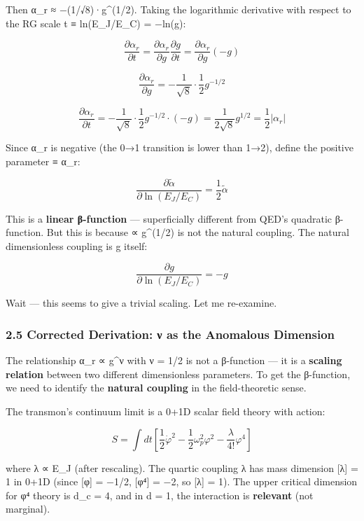 \documentclass[
]{article}
\begin{document}
Then α\_r ≈ −(1/√8)·g\^{}(1/2). Taking the logarithmic derivative with
respect to the RG scale t ≡ ln(E\_J/E\_C) = −ln(g):

\[\frac{\partial\alpha_r}{\partial t} = \frac{\partial\alpha_r}{\partial g}\frac{\partial g}{\partial t} = \frac{\partial\alpha_r}{\partial g}(-g)\]

\[\frac{\partial\alpha_r}{\partial g} = -\frac{1}{\sqrt{8}}\cdot\frac{1}{2}g^{-1/2}\]

\[\frac{\partial\alpha_r}{\partial t} = -\frac{1}{\sqrt{8}}\cdot\frac{1}{2}g^{-1/2}\cdot(-g) = \frac{1}{2\sqrt{8}}g^{1/2} = \frac{1}{2}|\alpha_r|\]

Since α\_r is negative (the 0→1 transition is lower than 1→2), define
the positive parameter  ≡ \textbar α\_r\textbar:

\[\boxed{\frac{\partial\tilde{\alpha}}{\partial\ln(E_J/E_C)} = \frac{1}{2}\tilde{\alpha}}\]

This is a \textbf{linear β-function} --- superficially different from
QED's quadratic β-function. But this is because  ∝ g\^{}(1/2)
is not the natural coupling. The natural dimensionless coupling is g
itself:

\[\frac{\partial g}{\partial\ln(E_J/E_C)} = -g\]

Wait --- this seems to give a trivial scaling. Let me re-examine.

\subsubsection{2.5 Corrected Derivation: ν as the Anomalous
Dimension}\label{corrected-derivation-ux3bd-as-the-anomalous-dimension}

The relationship α\_r ∝ g\^{}ν with ν = 1/2 is not a β-function --- it
is a \textbf{scaling relation} between two different dimensionless
parameters. To get the β-function, we need to identify the
\textbf{natural coupling} in the field-theoretic sense.

The transmon's continuum limit is a 0+1D scalar field theory with
action:

\[S = \int dt\left[\frac{1}{2}\dot{\varphi}^2 - \frac{1}{2}\omega_p^2\varphi^2 - \frac{\lambda}{4!}\varphi^4\right]\]

where λ ∝ E\_J (after rescaling). The quartic coupling λ has mass
dimension {[}λ{]} = 1 in 0+1D (since {[}φ{]} = −1/2, {[}φ⁴{]} = −2, so
{[}λ{]} = 1). The upper critical dimension for φ⁴ theory is d\_c = 4,
and in d = 1, the interaction is \textbf{relevant} (not marginal).
\end{document}
